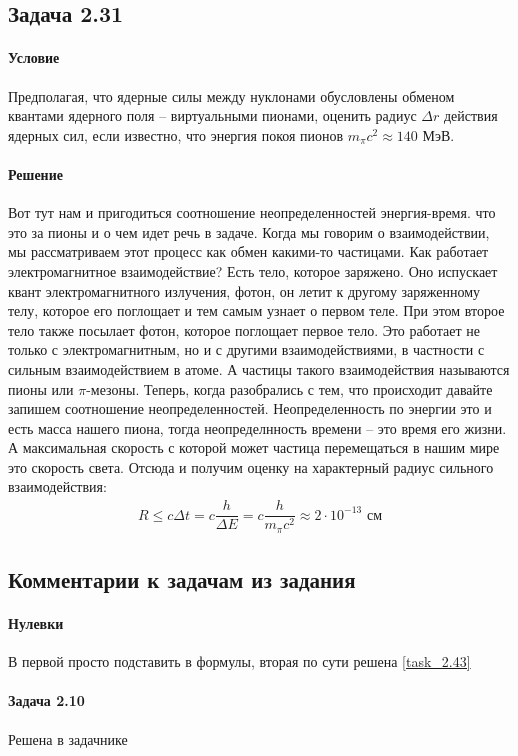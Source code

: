 \documentclass[12pt]{article}
\begin{document}
\subsection{Задача 2.31}
\label{task_2.31}
\paragraph{Условие}
Предполагая, что ядерные силы между нуклонами обусловлены обменом квантами ядерного поля -- виртуальными пионами, оценить радиус $\Delta r$ действия ядерных сил, если известно, что энергия покоя пионов $m_{\pi}c^2 \approx 140$ МэВ.
\paragraph{Решение}
Вот тут нам и пригодиться соотношение неопределенностей энергия-время. что это за пионы и о чем идет речь в задаче. Когда мы говорим о взаимодействии, мы рассматриваем этот процесс как обмен какими-то частицами. Как работает электромагнитное взаимодействие? Есть тело, которое заряжено. Оно испускает квант электромагнитного излучения, фотон, он летит к другому заряженному телу, которое его поглощает и тем самым узнает о первом теле. При этом второе тело также посылает фотон, которое поглощает первое тело. Это работает не только с электромагнитным, но и с другими взаимодействиями, в частности с сильным взаимодействием в атоме. А частицы такого взаимодействия называются пионы или $\pi$-мезоны.
Теперь, когда разобрались с тем, что происходит давайте запишем соотношение неопределенностей. Неопределенность по энергии это и есть масса нашего пиона, тогда неопределнность времени -- это время его жизни. А максимальная скорость с которой может частица перемещаться в нашим мире это скорость света. Отсюда и получим оценку на характерный радиус сильного взаимодействия:
\begin{gather*}
    R \le c\Delta t = c\dfrac{h}{\Delta E} = c\dfrac{h}{m_{\pi}c^2}\approx 2\cdot 10^{-13} \text{ см}
\end{gather*}


\subsection{Комментарии к задачам из задания}
\paragraph{Нулевки} В первой просто подставить в формулы, вторая по сути решена \ref{task_2.43}
\paragraph{Задача 2.10} Решена в задачнике
\end{document}

